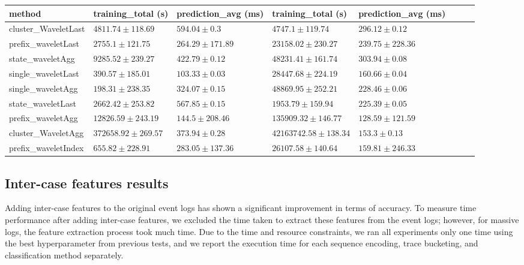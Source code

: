 \begin{table}[!htbp]
{\begin{tabular}{llllllll}
			method  & training\_total (s) & prediction\_avg (ms) & training\_total (s) & prediction\_avg (ms) \\ \midrule
			cluster\_WaveletLast & $4811.74 \pm 118.69$ & $594.04 \pm 0.3$ & $4747.1 \pm 119.74$ & $296.12 \pm 0.12$ \\ 
			prefix\_waveletLast & $2755.1 \pm 121.75$ & $264.29 \pm 171.89$ & $23158.02 \pm 230.27$ & $239.75 \pm 228.36$ \\ 
			state\_waveletAgg & $9285.52 \pm 239.27$ & $422.79 \pm 0.12$ & $48231.41 \pm 161.74$ & $303.94 \pm 0.08$ \\ 
			single\_waveletLast & $390.57 \pm 185.01$ & $\mathbf{103.33 \pm 0.03}$ & $28447.68 \pm 224.19$ & $160.66 \pm 0.04$ \\ 
			single\_waveletAgg & $\mathbf{198.31 \pm 238.35}$ & $324.07 \pm 0.15$ & $48869.95 \pm 252.21$ & $228.46 \pm 0.06$ \\ 
			state\_waveletLast & $2662.42 \pm 253.82$ & $567.85 \pm 0.15$ & $\mathbf{1953.79 \pm 159.94}$ & $225.39 \pm 0.05$ \\ 
			prefix\_waveletAgg & $12826.59 \pm 243.19$ & $144.5 \pm 208.46$ & $135909.32 \pm 146.77$ & $\mathbf{128.59 \pm 121.59}$ \\ 
			cluster\_WaveletAgg & $372658.92 \pm 269.57$ & $373.94 \pm 0.28$ & $42163742.58 \pm 138.34$ & $153.3 \pm 0.13$ \\ 
			prefix\_waveletIndex & $655.82 \pm 228.91$ & $283.05 \pm 137.36$ & $26107.58 \pm 140.64$ & $159.81 \pm 246.33$ \\ 
			\bottomrule
			

		\end{tabular}%
	}
	
	
\end{table}



\subsection{Inter-case features results}
Adding inter-case features to the original event logs has shown a significant improvement in terms of accuracy. To measure time performance after adding inter-case features, we excluded the time taken to extract these features from the event logs; however, for massive logs, the feature extraction process took much time. Due to the time and resource constraints, we ran all experiments only one time using the best hyperparameter from previous tests, and we report the execution time for each sequence encoding, trace bucketing, and classification method separately. 

